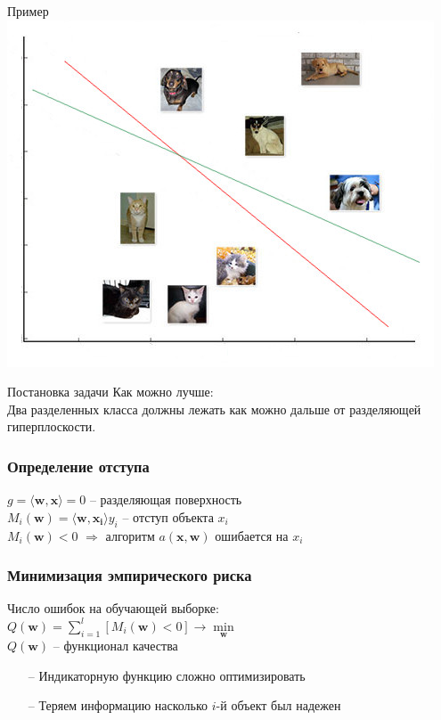 \documentclass[10pt]{beamer}
\begin{document}
\begin{frame}{Пример}
  \centering
  \includegraphics[width=0.9 \textwidth, keepaspectratio]{images/catdog}
\end{frame}

\begin{frame}{Постановка задачи}
  Как можно лучше:\\
  Два разделенных класса должны лежать как можно дальше от разделяющей гиперплоскости.
\end{frame}

\begin{frame}\frametitle{Определение отступа}
	${g = \langle \mathbf{w}, \mathbf{x}\rangle = 0}$ -- разделяющая поверхность\\
	$M_i(\mathbf{w}) = \langle \mathbf{w}, \mathbf{x_i}\rangle y_i$ -- отступ объекта $x_i$\\
	${M_i(\mathbf{w})<0}$ $\Rightarrow$ алгоритм $a(\mathbf{x},\mathbf{w})$ ошибается на $x_i$
\end{frame}

\begin{frame}\frametitle{Минимизация эмпирического риска}
	Число ошибок на обучающей выборке:\\
	\bigbreak
	${Q(\mathbf{w}) = \sum\limits_{i=1}^l \left[ M_i(\mathbf{w}) < 0 \right] \rightarrow \min\limits_{\mathbf{w}} }$\\
	\bigbreak
	${Q(\mathbf{w})}$ -- функционал качества\\
	\bigbreak
	\pause
  \begin{itemize}[<+->]
		\item[--] Индикаторную функцию сложно оптимизировать
		\item[--] Теряем информацию насколько ${i}$-й объект был надежен
	\end{itemize}
\end{frame}
\end{document}

